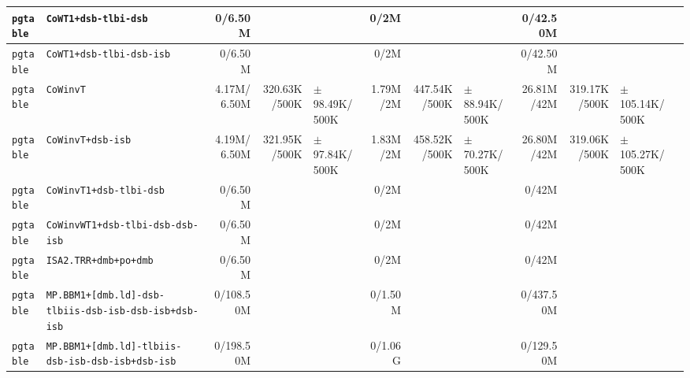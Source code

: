 \begin{tabular}{l l  | r r l | r r l | r r l l}
        \verb|pgtable| &                                   \verb|CoWT1+dsb-tlbi-dsb| &        0/6.50M &                       &                   &           0/2M &                       &                   &       0/42.50M &                       &                    & \\ \hline 
        \verb|pgtable| &                               \verb|CoWT1+dsb-tlbi-dsb-isb| &        0/6.50M &                       &                   &           0/2M &                       &                   &       0/42.50M &                       &                    & \\ \hline 
        \verb|pgtable| &                                              \verb|CoWinvT| &    4.17M/6.50M &          320.63K/500K & $\pm$ 98.49K/500K &       1.79M/2M &          447.54K/500K & $\pm$ 88.94K/500K &     26.81M/42M &          319.17K/500K & $\pm$ 105.14K/500K & \\ \hline 
        \verb|pgtable| &                                      \verb|CoWinvT+dsb-isb| &    4.19M/6.50M &          321.95K/500K & $\pm$ 97.84K/500K &       1.83M/2M &          458.52K/500K & $\pm$ 70.27K/500K &     26.80M/42M &          319.06K/500K & $\pm$ 105.27K/500K & \\ \hline 
        \verb|pgtable| &                                \verb|CoWinvT1+dsb-tlbi-dsb| &        0/6.50M &                       &                   &           0/2M &                       &                   &          0/42M &                       &                    & \\ \hline 
        \verb|pgtable| &                       \verb|CoWinvWT1+dsb-tlbi-dsb-dsb-isb| &        0/6.50M &                       &                   &           0/2M &                       &                   &          0/42M &                       &                    & \\ \hline 
        \verb|pgtable| &                                  \verb|ISA2.TRR+dmb+po+dmb| &        0/6.50M &                       &                   &           0/2M &                       &                   &          0/42M &                       &                    & \\ \hline 
        \verb|pgtable| &  \verb|MP.BBM1+[dmb.ld]-dsb-tlbiis-dsb-isb-dsb-isb+dsb-isb| &      0/108.50M &                       &                   &        0/1.50M &                       &                   &      0/437.50M &                       &                    & \\ \hline 
        \verb|pgtable| &      \verb|MP.BBM1+[dmb.ld]-tlbiis-dsb-isb-dsb-isb+dsb-isb| &      0/198.50M &                       &                   &        0/1.06G &                       &                   &      0/129.50M &                       &                    & \\ \hline 

\end{tabular}

